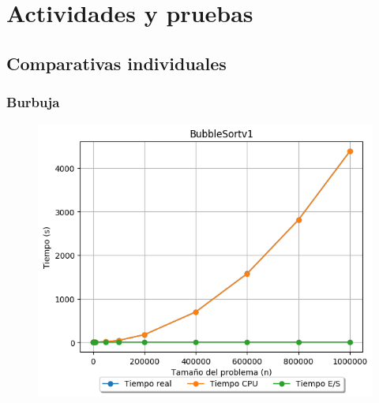 \documentclass[12pt, fleqn]{report}                             %
\theoremstyle{break}                                            %
\begin{document}
	        \inputminted[breaklines, linenos, tabsize=4, fontsize=\footnotesize, firstline=80, lastline=103, firstnumber=1]{c}{code/TreeAuxFunction.c}
	        
	        \inputminted[breaklines, linenos, tabsize=4, fontsize=\footnotesize, firstline=26, lastline=33, firstnumber=1]{c}{code/SortWithBST.c}
	
	\clearpage
	
	\section{Actividades y pruebas}
	
	    \subsection{Comparativas individuales}
	    
    	    \subsubsection{Burbuja}
    	        \begin{figure}[H]
    	            \centering
    	            \includegraphics[scale=0.78]{graphics/BubbleSortv1-ExperimentalTimes.png}
    	        \end{figure}
    	        
\end{document}
